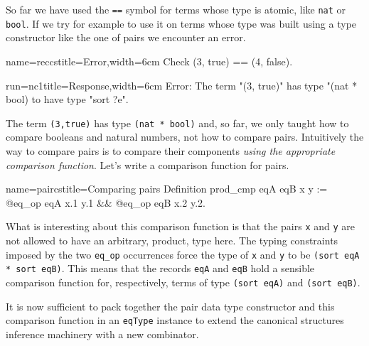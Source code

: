 
So far we have used the \lstinline/==/ symbol for terms whose type is
atomic, like \lstinline/nat/ or \lstinline/bool/.  If we try for
example to use it on terms whose type was built using a type
constructor like the one of pairs we encounter an error.

\begin{coq-left}{name=reccs}{title=Error,width=6cm}
Check (3, true) == (4, false).
$~$
$~$
\end{coq-left}
\begin{coqout-right}{run=nc1}{title=Response,width=6cm}
Error: The term "(3, true)" has type
"(nat * bool)%
to have type "sort ?e".
\end{coqout-right}

The term \lstinline/(3,true)/ has type \lstinline/(nat * bool)/ and,
so far, we only taught \Coq{} how to compare booleans and natural
numbers, not how to compare pairs.
Intuitively the way to compare pairs is to compare their components
\emph{using the appropriate comparison function}.
Let's write a comparison function for pairs.

\begin{coq}{name=paircs}{title=Comparing pairs}
Definition prod_cmp eqA eqB x y :=
  @eq_op eqA x.1 y.1 && @eq_op eqB x.2 y.2.
\end{coq}

What is interesting about this comparison function is that the
pairs \lstinline/x/ and \lstinline/y/ are not allowed to have
an arbitrary, product, type here.  The typing constraints imposed
by the two \lstinline/eq_op/ occurrences force the type of
\lstinline/x/ and \lstinline/y/ to be
\lstinline/(sort eqA * sort eqB)/.  This means
that the records \lstinline/eqA/ and \lstinline/eqB/ hold
a sensible comparison function for, respectively, terms of
type \lstinline/(sort eqA)/ and \lstinline/(sort eqB)/.

It is now sufficient to pack together the pair data type
constructor and this comparison function in an \lstinline/eqType/
instance to extend the canonical structures inference machinery
with a new combinator.

